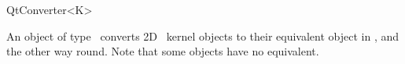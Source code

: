 
\begin{ccRefClass}{QtConverter<K>}

\ccDefinition
An object of type \ccRefName\ converts 2D \cgal\ kernel objects to their equivalent 
object in \qt, and the other way round. Note that some objects have no equivalent.




\end{ccRefClass}








